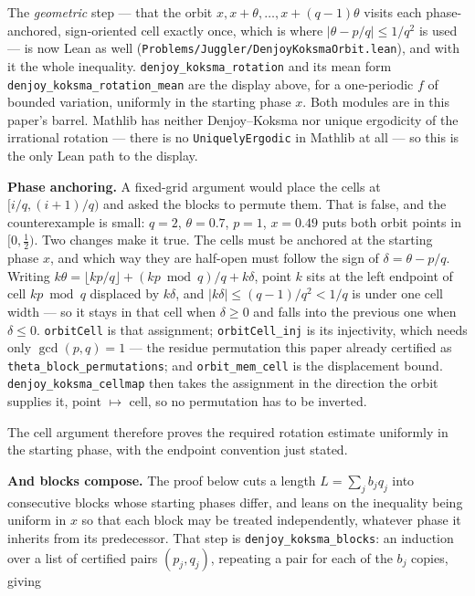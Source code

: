 \documentclass[12pt]{article}
\begin{document}
The \emph{geometric} step --- that the orbit
\(x, x+\theta, \ldots, x+(q-1)\theta\) visits each phase-anchored,
sign-oriented cell exactly once, which is where
\(|\theta-p/q|\le 1/q^2\) is used --- is now Lean as well
(\texttt{\nolinkurl{Problems/Juggler/DenjoyKoksmaOrbit.lean}}), and with
it the whole inequality. \texttt{\nolinkurl{denjoy_koksma_rotation}} and
its mean form \texttt{\nolinkurl{denjoy_koksma_rotation_mean}} are the
display above, for a one-periodic \(f\) of bounded variation, uniformly
in the starting phase \(x\). Both modules are in this paper's barrel.
Mathlib has neither Denjoy--Koksma nor unique ergodicity of the
irrational rotation --- there is no \texttt{\nolinkurl{UniquelyErgodic}}
in Mathlib at all --- so this is the only Lean path to the display.

\textbf{Phase anchoring.} A fixed-grid argument would place the cells at
\([i/q,(i+1)/q)\) and asked the blocks to permute them. That is false,
and the counterexample is small: \(q=2\), \(\theta=0.7\), \(p=1\),
\(x=0.49\) puts both orbit points in \([0,\tfrac12)\). Two changes make
it true. The cells must be anchored at the starting phase \(x\), and
which way they are half-open must follow the sign of
\(\delta=\theta-p/q\). Writing
\(k\theta=\lfloor kp/q\rfloor+(kp\bmod q)/q+k\delta\), point \(k\) sits
at the left endpoint of cell \(kp\bmod q\) displaced by \(k\delta\), and
\(|k\delta|\le (q-1)/q^{2}<1/q\) is under one cell width --- so it stays
in that cell when \(\delta\ge0\) and falls into the previous one when
\(\delta\le0\). \texttt{\nolinkurl{orbitCell}} is that assignment;
\texttt{\nolinkurl{orbitCell_inj}} is its injectivity, which needs only
\(\gcd(p,q)=1\) --- the residue permutation this paper already certified
as \texttt{\nolinkurl{theta_block_permutations}}; and
\texttt{\nolinkurl{orbit_mem_cell}} is the displacement bound.
\texttt{\nolinkurl{denjoy_koksma_cellmap}} then takes the assignment in
the direction the orbit supplies it, point \(\mapsto\) cell, so no
permutation has to be inverted.

The cell argument therefore proves the required rotation estimate
uniformly in the starting phase, with the endpoint convention just
stated.

\textbf{And blocks compose.} The proof below cuts a length
\(L=\sum_jb_jq_j\) into consecutive blocks whose starting phases differ,
and leans on the inequality being uniform in \(x\) so that each block
may be treated independently, whatever phase it inherits from its
predecessor. That step is \texttt{\nolinkurl{denjoy_koksma_blocks}}: an
induction over a list of certified pairs \((p_j,q_j)\), repeating a pair
for each of the \(b_j\) copies, giving
\end{document}
